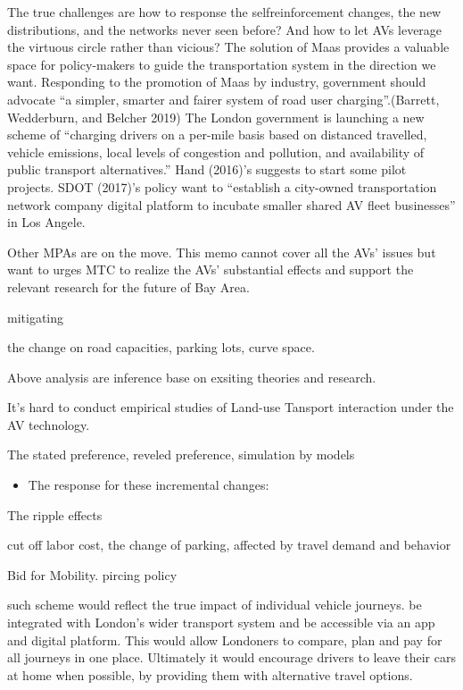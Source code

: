 \documentclass[12pt,]{article}
\providecommand{\tightlist}{%
  \setlength{\itemsep}{0pt}\setlength{\parskip}{0pt}}
\begin{document}
The true challenges are how to response the selfreinforcement changes,
the new distributions, and the networks never seen before? And how to
let AVs leverage the virtuous circle rather than vicious? The solution
of Maas provides a valuable space for policy-makers to guide the
transportation system in the direction we want. Responding to the
promotion of Maas by industry, government should advocate ``a simpler,
smarter and fairer system of road user charging''.(Barrett, Wedderburn,
and Belcher 2019) The London government is launching a new scheme of
``charging drivers on a per-mile basis based on distanced travelled,
vehicle emissions, local levels of congestion and pollution, and
availability of public transport alternatives.'' Hand (2016)'s suggests
to start some pilot projects. SDOT (2017)'s policy want to ``establish a
city-owned transportation network company digital platform to incubate
smaller shared AV fleet businesses'' in Los Angele.

Other MPAs are on the move. This memo cannot cover all the AVs' issues
but want to urges MTC to realize the AVs' substantial effects and
support the relevant research for the future of Bay Area.

mitigating

the change on road capacities, parking lots, curve space.

Above analysis are inference base on exsiting theories and research.

It's hard to conduct empirical studies of Land-use Tansport interaction
under the AV technology.

The stated preference, reveled preference, simulation by models

\begin{itemize}
\tightlist
\item
  The response for these incremental changes:
\end{itemize}

The ripple effects

cut off labor cost, the change of parking, affected by travel demand and
behavior

Bid for Mobility. pircing policy

such scheme would reflect the true impact of individual vehicle
journeys. be integrated with London's wider transport system and be
accessible via an app and digital platform. This would allow Londoners
to compare, plan and pay for all journeys in one place. Ultimately it
would encourage drivers to leave their cars at home when possible, by
providing them with alternative travel options.
\end{document}
